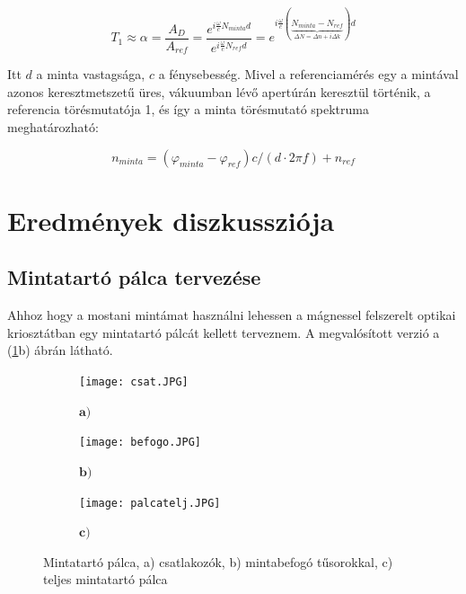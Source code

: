 \documentclass[a4paper,12pt]{article}
\numberwithin{equation}{section}
\begin{document}
\begin{equation}\label{eq:7}
T_{1}\approx\alpha=\frac{A_D}{A_{ref}}=\frac{e^{i \frac{\omega}{c} N_{minta} d}}{e^{i \frac{\omega}{c} N_{ref} d}}=e^{i \frac{\omega}{c}(\underbrace{N_{minta}-N_{ref}}_{\Delta N=\Delta n+i \Delta k}) d}
\end{equation}

Itt $d$ a minta vastagsága, $c$ a fénysebesség. Mivel a referenciamérés egy a mintával azonos keresztmetszetű üres, vákuumban lévő apertúrán keresztül történik, a referencia törésmutatója 1, és így a minta törésmutató spektruma meghatározható: 

\begin{equation}\label{eq:8}
    n_{minta}=(\varphi_{minta}-\varphi_{ref})c/(d\cdot2\pi f)+n_{ref}
    \end{equation}

\newpage


\section{Eredmények diszkussziója}
\subsection{Mintatartó pálca tervezése}
Ahhoz hogy a mostani mintámat használni lehessen a mágnessel felszerelt optikai kriosztátban egy mintatartó pálcát kellett terveznem. A megvalósított verzió a (\ref{fig:palca}b) ábrán látható.



\begin{figure}[H]
  \centering

  \begin{subfigure}[b]{0.3\textwidth}
    \caption*{$\bm{a)}$}
    \centering
    \texttt{[image: csat.JPG]}
  \end{subfigure}
  \hfill
  \begin{subfigure}[b]{0.66\textwidth}
  \caption*{$\bm{b)}$}
    \centering
    \texttt{[image: befogo.JPG]}
  \end{subfigure}
  
  \vspace{-4pt} %
  
  \begin{subfigure}[b]{\textwidth}
  \caption*{$\bm{c)}$}
    \centering
    \texttt{[image: palcatelj.JPG]}
  \end{subfigure}
  
  \caption{Mintatartó pálca, a) csatlakozók, b) mintabefogó tűsorokkal, c) teljes mintatartó pálca}
  \label{fig:palca}
\end{figure}
\end{document}
